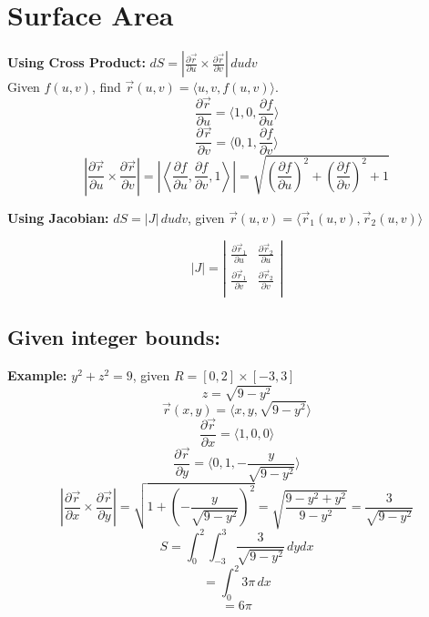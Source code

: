 \documentclass{article}
\begin{document}
\section{Surface Area}
\textbf{Using Cross Product: }$dS=|\frac{\partial \vec{r}}{\partial u} \times \frac{\partial \vec{r}}{\partial v}|\,dudv$ \\
Given $f(u, v)$, find $\vec{r}(u, v)=\langle u, v, f(u, v) \rangle$.
\[
\frac{\partial \vec{r}}{\partial u}=\langle 1, 0, \frac{\partial f}{\partial u} \rangle
\]
\[
\frac{\partial \vec{r}}{\partial v}=\langle 0, 1, \frac{\partial f}{\partial v} \rangle
\]
\[
\left|\frac{\partial \vec{r}}{\partial u} \times \frac{\partial \vec{r}}{\partial v}\right|=\left|\left\langle \frac{\partial f}{\partial u}, \frac{\partial f}{\partial v}, 1 \right\rangle\right|=\sqrt{\left(\frac{\partial f}{\partial u}\right)^2+\left(\frac{\partial f}{\partial v}\right)^2+1}
\]

\textbf{Using Jacobian: }$dS=|J|\,dudv$, given $\vec{r}(u, v)=\langle \vec{r}_{1}(u, v), \vec{r}_{2}(u, v) \rangle$

\renewcommand{\arraystretch}{1.5}
\[
|J| = \left|\begin{array}{cc}
\frac{\partial \vec{r}_1}{\partial u} & \frac{\partial \vec{r}_2}{\partial u} \\
\frac{\partial \vec{r}_1}{\partial v} & \frac{\partial \vec{r}_2}{\partial v} \\
\end{array}\right|
\]

\subsection{Given integer bounds:}
\textbf{Example: }$y^2+z^2=9$, given $R=[0,2] \times [-3, 3]$
\[
z=\sqrt{9-y^2}
\]
\[
\vec{r}(x, y)=\langle x, y, \sqrt{9-y^2} \rangle
\]
\[
\frac{\partial \vec{r}}{\partial x}=\langle 1, 0, 0 \rangle
\]
\[
\frac{\partial \vec{r}}{\partial y}=\langle 0, 1, -\frac{y}{\sqrt{9-y^2}} \rangle
\]
\[
\left|\frac{\partial \vec{r}}{\partial x} \times \frac{\partial \vec{r}}{\partial y}\right|=\sqrt{1+\left(-\frac{y}{\sqrt{9-y^2}}\right)^2}=\sqrt{\frac{9-y^2+y^2}{9-y^2}}=\frac{3}{\sqrt{9-y^2}}
\]
\[
S=\int_{0}^{2} \int_{-3}^{3} \frac{3}{\sqrt{9-y^2}}\, dydx
\]
\[
=\int_{0}^{2} 3\pi\, dx
\]
\[
=6\pi
\]
\end{document}

